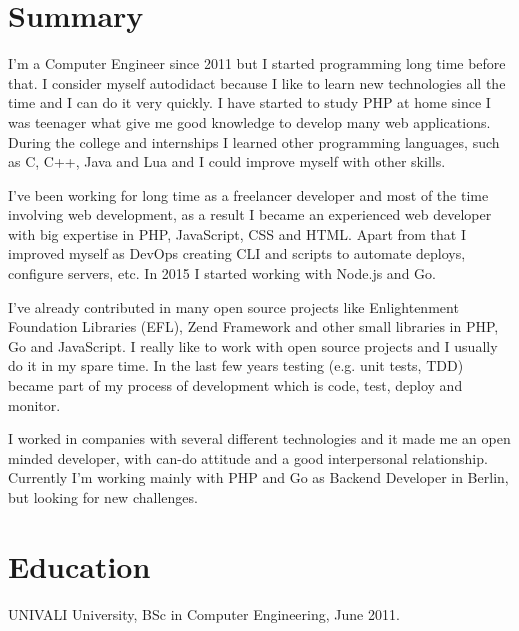 \documentclass[margin]{res}
\begin{document}
\address{Berlin, DE \\ xguiga@gmail.com \\ Phone: +49 (173) 979-9383 }

\begin{resume}

\section{Summary}
I'm a Computer Engineer since 2011 but I started programming long time before that. I consider myself autodidact because I like to learn new technologies all the time and I can do it very quickly. I have started to study PHP at home since I was teenager what give me good knowledge to develop many web applications. During the college and internships I learned other programming languages, such as C, C++, Java and Lua and I could improve myself with other skills.

I've been working for long time as a freelancer developer and most of the time involving web development, as a result I became an experienced web developer with big expertise in PHP, JavaScript, CSS and HTML. Apart from that I improved myself as DevOps creating CLI and scripts to automate deploys, configure servers, etc. In 2015 I started working with Node.js and Go.

I've already contributed in many open source projects like Enlightenment Foundation Libraries (EFL), Zend Framework and other small libraries in PHP, Go and JavaScript. I really like to work with open source projects and I usually do it in my spare time. In the last few years testing (e.g. unit tests, TDD) became part of my process of development which is code, test, deploy and monitor.

I worked in companies with several different technologies and it made me an open minded developer, with can-do attitude and a good interpersonal relationship. Currently I'm working mainly with PHP and Go as Backend Developer in Berlin, but looking for new challenges.

\section{Education} UNIVALI University, BSc in Computer Engineering, June 2011.


\end{resume}
\end{document}
